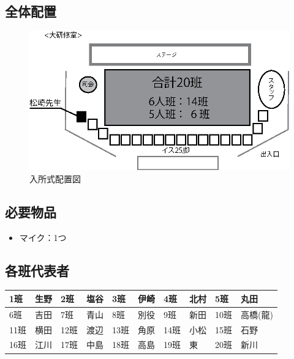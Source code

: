 \subsection{全体配置}
\begin{figure}[H]
  \begin{center}
  \includegraphics[scale=1.5]{./08/nyushoshiki.eps}
  \caption{入所式配置図}
  \label{nyusyosiki}
  \end{center}
\end{figure}


\subsection{必要物品}
\begin{itemize}
\item マイク：1つ
\end{itemize}

\clearpage

\subsection{各班代表者}
\begin{table}[htb]
  \begin{center}
  \begin{tabular}{|l|l||l|l||l|l||l|l||l|l|} \hline
  1班 & 生野 & 2班 & 塩谷 & 3班 & 伊崎 & 4班 & 北村 & 5班 & 丸田 \\ \hline
  6班 & 吉田 & 7班 & 青山 & 8班 & 別役 & 9班 & 新田 & 10班 & 高橋(龍) \\  \hline
  11班 & 横田 & 12班 & 渡辺 & 13班 & 角原 & 14班 & 小松 & 15班 & 石野 \\ \hline
  16班 & 江川 & 17班 & 中島 & 18班 & 高島 & 19班 & 東 & 20班 & 新川 \\ \hline
    \end{tabular}
  \end{center}
\end{table}


